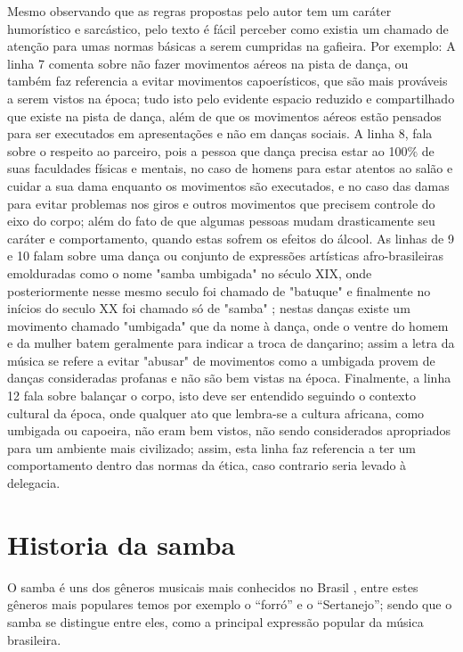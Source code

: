 Mesmo observando que as regras propostas pelo autor tem um caráter humorístico e sarcástico,
pelo texto é fácil perceber como existia um chamado de atenção para umas
normas básicas a serem cumpridas na gafieira. Por exemplo: 
A linha 7
comenta sobre não fazer movimentos aéreos na pista de dança,
ou também faz referencia a evitar movimentos capoerísticos,
que são mais prováveis a serem vistos na época; tudo isto
pelo evidente espacio reduzido e compartilhado que existe na pista de dança, 
além de que os movimentos aéreos estão pensados para ser
executados em apresentações e não em danças sociais. 
A linha 8, fala
sobre o respeito ao parceiro, pois a pessoa que dança precisa
estar ao 100$\%$ de suas faculdades físicas e mentais, no caso de homens para estar atentos
ao salão e cuidar a sua dama enquanto os movimentos são executados, 
e no caso das damas para evitar problemas
nos giros e outros movimentos que precisem  controle do eixo do corpo; 
além do fato de que algumas pessoas mudam drasticamente seu 
caráter e comportamento, quando estas sofrem os efeitos do álcool.
As linhas de 9 e 10 falam sobre uma dança ou conjunto de expressões artísticas 
afro-brasileiras emolduradas como o nome "samba umbigada" no século XIX, onde
posteriormente nesse mesmo seculo foi chamado de "batuque" e finalmente no inícios do seculo XX foi chamado só 
de "samba" \cite[pp. 47]{diniz2008almanaque} \cite[pp. 85]{sandroni2001feitico}; nestas danças existe
um movimento chamado "umbigada" \cite{da2015historia} que da nome à dança, onde o ventre do homem e da mulher batem geralmente para indicar
a troca de dançarino; assim a letra da música se refere a
 evitar "abusar" de movimentos como a umbigada provem de danças consideradas profanas e não são bem vistas na época.
Finalmente,
a linha 12 fala sobre balançar o corpo, isto deve ser entendido seguindo o contexto cultural da 
época, onde qualquer ato que lembra-se a cultura africana, como umbigada ou capoeira, 
não eram bem vistos, não sendo considerados apropriados para um ambiente mais civilizado; 
assim, esta linha faz referencia a ter um comportamento dentro das normas da ética,
caso contrario seria levado à delegacia.


\section{Historia da samba}
O samba é uns dos gêneros musicais mais conhecidos no Brasil \cite[pp. 46-47]{diniz2008almanaque},
entre estes gêneros mais populares temos por exemplo o ``forró'' e o ``Sertanejo'';
sendo que o samba se distingue entre eles, como a principal expressão popular da música brasileira. 

